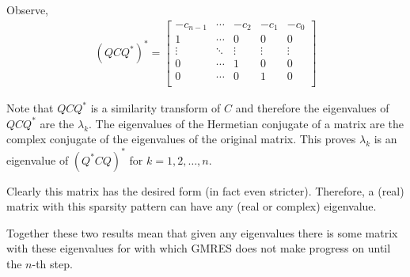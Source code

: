 \documentclass[10pt]{article}
\begin{document}
\begin{solution}[Solution]
\begin{enumerate}
        Observe,
        \begin{align*}
            (QCQ^*)^* = 
            \left[\begin{array}{rrrrr}
                -c_{n-1} & \cdots & -c_2 & -c_1 & -c_0 \\
                1 & \cdots & 0 & 0 & 0 \\
                \vdots & \ddots & \vdots & \vdots & \vdots \\
                0 & \cdots & 1 & 0 & 0\\
                0  & \cdots & 0 & 1 & 0\\
            \end{array}\right]
        \end{align*}
        
        Note that \( QCQ^* \) is a similarity transform of \( C \) and therefore the eigenvalues of \( QCQ^* \) are the \( \lambda_k \). The eigenvalues of the Hermetian conjugate of a matrix are the complex conjugate of the eigenvalues of the original matrix. This proves \( \lambda_k \) is an eigenvalue of \( (Q^*CQ)^* \) for \( k=1,2,\ldots, n \).

        Clearly this matrix has the desired form (in fact even stricter). Therefore, a (real) matrix with this sparsity pattern can have any (real or complex) eigenvalue.

        \vspace{1em}

        Together these two results mean that given any eigenvalues there is some matrix with these eigenvalues for with which GMRES does not make progress on until the \( n \)-th step.

\end{enumerate}
\end{solution}
\end{document}

